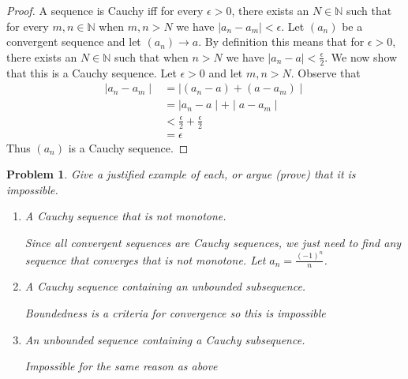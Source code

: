 \documentclass[12pt]{article}
\newtheorem{problem}{Problem}
\newcommand{\NN}{\ensuremath{\mathbb N}}
\newcommand{\eps}{\ensuremath{\epsilon}}
\begin{document}
\begin{proof}
A sequence is Cauchy iff for every $\eps > 0$, there exists an $N \in \NN$ such that for every $m, n \in \NN$ when $m,n > N$ we have $|a_n - a_m| < \eps$.
\newline
\newline
Let $(a_n)$ be a convergent sequence and let $(a_n) \to a$. By definition this means that for $\eps > 0$, there exists an $N \in \NN$ such that when $n > N$ we have $|a_n - a| < \frac{\eps}{2}$. We now show that this is a Cauchy sequence. Let $\eps > 0$ and let $m,n > N$. Observe that
\begin{align*}
  \mid a_n - a_m \mid &= \mid (a_n - a) + (a - a_m) \mid \\
                      &= \mid a_n - a \mid + \mid a - a_m \mid \\
                      &< \frac{\eps}{2} + \frac{\eps}{2} \\
                      &= \eps
\end{align*}
Thus $(a_n)$ is a Cauchy sequence.
\end{proof}


\begin{problem} %
Give a justified example of each, or argue (prove) that it is impossible.

\renewcommand{\labelenumi}{(\alph{enumi})}
\begin{enumerate}
\item A Cauchy sequence that is not monotone.

Since all convergent sequences are Cauchy sequences, we just need to find any sequence that converges that is not monotone.
Let $a_n = \frac{(-1)^n}{n}$. 

\item A Cauchy sequence containing an unbounded subsequence.

Boundedness is a criteria for convergence so this is impossible

\item An unbounded sequence containing a Cauchy subsequence.

Impossible for the same reason as above

\end{enumerate}
\end{problem}
\end{document}
